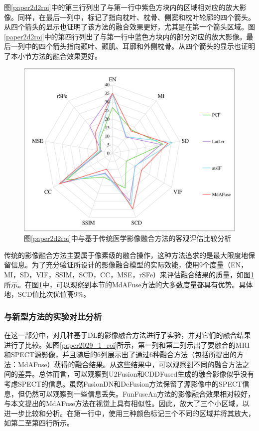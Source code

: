 图\ref{paper2d2roi}中的第三行列出了与第一行中紫色方块内的区域相对应的放大影像。同样，在最后一列中，标记了指向枕叶、枕骨、侧窦和枕叶轮廓的四个箭头。从四个箭头的显示也证明了该方法的融合效果更好，尤其是在第一个箭头区域。图\ref{paper2d2roi}中的第四行列出了与第一行中蓝色方块内的部分对应的放大影像。最后一列中的四个箭头指向颞叶、颞肌、耳廓和外侧枕骨。从四个箭头的显示也证明了本小节方法的融合效果更好。

    \begin{figure}[ht]
      \centering
      \includegraphics[width=0.9\linewidth]{figs/paper2traditionMetrics2024.pdf}
      \caption{图\ref{paper2d2roi}中与基于传统医学影像融合方法的客观评估比较分析}\label{paper2d2_10roi_value}
    \end{figure}

传统的影像融合方法主要属于像素级的融合操作，这种方法追求的是最大限度地保留信息。为了充分验证所设计的影像融合模型的实际效能，使用9个度量（EN，MI，SD，VIF，SSIM，SCD，CC，MSE，rSFe）来评估融合结果的质量，如图\ref{paper2d2_10roi_value}所示。在图\ref{paper2d2_10roi_value}中，可以观察到本节的MdAFuse方法的大多数度量都具有优势。具体地，SCD值比次优值高9\%。


\subsubsection{与新型方法的实验对比分析}
在这一部分中，对几种基于DL的影像融合方法进行了实验，并对它们的融合结果进行了比较。如图\ref{paper2029_1_roi}所示，第一列和第二列示出了要融合的MRI和SPECT源影像，并且随后的6列展示出了通过6种融合方法（包括所提出的方法：MdAFuse）获得的融合结果。从这些结果中，可以观察到不同的融合方法之间的差异。总体而言，可以观察到U2Fusion和CDDFused生成的融合影像似乎没有考虑SPECT的信息。虽然FusionDN和DeFusion方法保留了源影像中的SPECT信息，但仍然可以观察到一些信息丢失。FunFuseAn方法的影像融合效果相对较好，与本文提出的MdAFuse方法在视觉上具有相似性。因此，放大了三个小区域，以进一步比较和分析。在第一行中，使用三种颜色标记三个不同的区域并将其放大，如第二至第四行所示。



